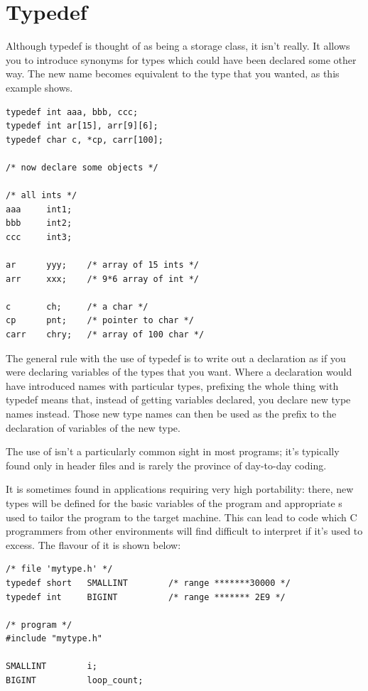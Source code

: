   

 
        \section{Typedef}
        

  

  Although typedef is thought of as being a storage class, it isn't
   really. It allows you to introduce synonyms for types which could have
   been declared some other way. The new name becomes equivalent to the type
   that you wanted, as this example shows.


\begin{Verbatim}
typedef int aaa, bbb, ccc;
typedef int ar[15], arr[9][6];
typedef char c, *cp, carr[100];

/* now declare some objects */

/* all ints */
aaa     int1;
bbb     int2;
ccc     int3;

ar      yyy;    /* array of 15 ints */
arr     xxx;    /* 9*6 array of int */

c       ch;     /* a char */
cp      pnt;    /* pointer to char */
carr    chry;   /* array of 100 char */
\end{Verbatim}

  The general rule with the use of typedef is to write out a declaration
   as if you were declaring variables of the types that you want. Where
   a declaration would have introduced names with particular types,
   prefixing the whole thing with typedef means that, instead of getting
   variables declared, you declare new type names instead. Those new type
   names can then be used as the prefix to the declaration of variables of
   the new type.


  The use of \typedef{} isn't a particularly common sight in
   most programs; it's typically found only in header files and is rarely
   the province of day-to-day coding.


  It is sometimes found in applications requiring very high portability:
   there, new types will be defined for the basic variables of the program
   and appropriate \typedef{}s used to tailor the program to the
   target machine. This can lead to code which C programmers from other
   environments will find difficult to interpret if it's used to excess. The
   flavour of it is shown below:


\begin{Verbatim}
/* file 'mytype.h' */
typedef short   SMALLINT        /* range *******30000 */
typedef int     BIGINT          /* range ******* 2E9 */

/* program */
#include "mytype.h"

SMALLINT        i;
BIGINT          loop_count;
\end{Verbatim}

